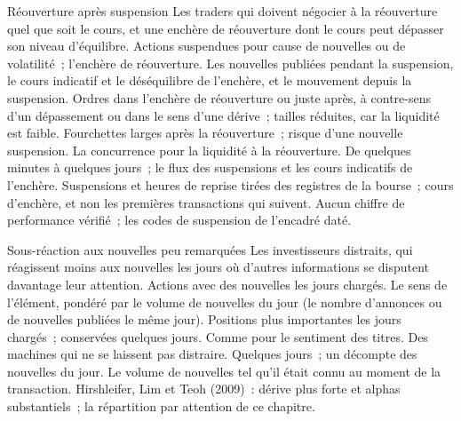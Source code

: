 \begin{strategyfile}{Réouverture après suspension}\label{strat:s1:news-and-events:halt}
 Les traders qui doivent négocier à la réouverture quel que soit le cours, et une enchère de réouverture dont le cours peut dépasser son niveau d'équilibre.
 Actions suspendues pour cause de nouvelles ou de volatilité~; l'enchère de réouverture.
 Les nouvelles publiées pendant la suspension, le cours indicatif et le déséquilibre de l'enchère, et le mouvement depuis la suspension.
 Ordres dans l'enchère de réouverture ou juste après, à contre-sens d'un dépassement ou dans le sens d'une dérive~; tailles réduites, car la liquidité est faible.
 Fourchettes larges après la réouverture~; risque d'une nouvelle suspension.
 La concurrence pour la liquidité à la réouverture.
 De quelques minutes à quelques jours~; le flux des suspensions et les cours indicatifs de l'enchère.
 Suspensions et heures de reprise tirées des registres de la bourse~; cours d'enchère, et non les premières transactions qui suivent.
 Aucun chiffre de performance vérifié~; les codes de suspension de l'encadré daté.
\end{strategyfile}

\begin{strategyfile}{Sous-réaction aux nouvelles peu remarquées}\label{strat:s1:news-and-events:attention}
 Les investisseurs distraits, qui réagissent moins aux nouvelles les jours où d'autres informations se disputent davantage leur attention.
 Actions avec des nouvelles les jours chargés.
 Le sens de l'élément, pondéré par le volume de nouvelles du jour (le nombre d'annonces ou de nouvelles publiées le même jour).
 Positions plus importantes les jours chargés~; conservées quelques jours.
 Comme pour le sentiment des titres.
 Des machines qui ne se laissent pas distraire.
 Quelques jours~; un décompte des nouvelles du jour.
 Le volume de nouvelles tel qu'il était connu au moment de la transaction.
 Hirshleifer, Lim et Teoh (2009)~: dérive plus forte et alphas substantiels~; la répartition par attention de ce chapitre.
\end{strategyfile}

